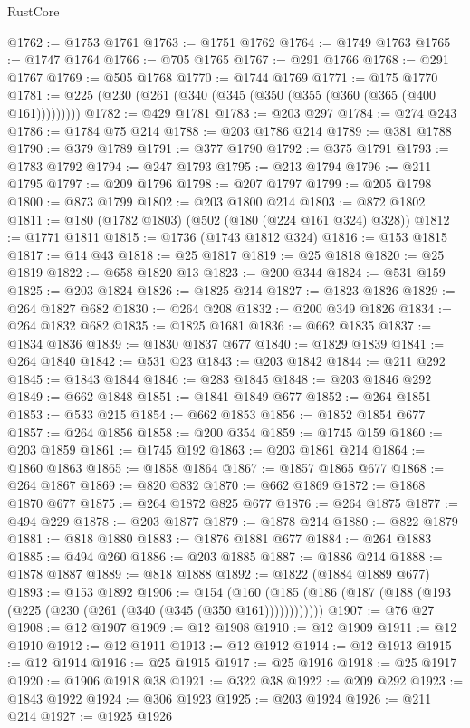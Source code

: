 \begin{lexlean}{RustCore}
\begin{coremodule}
@1762 := @1753 @1761
@1763 := @1751 @1762
@1764 := @1749 @1763
@1765 := @1747 @1764
@1766 := @705 @1765
@1767 := @291 @1766
@1768 := @291 @1767
@1769 := @505 @1768
@1770 := @1744 @1769
@1771 := @175 @1770
@1781 := @225 (@230 (@261 (@340 (@345 (@350 (@355 (@360 (@365 (@400 @161)))))))))
@1782 := @429 @1781
@1783 := @203 @297
@1784 := @274 @243
@1786 := @1784 @75 @214
@1788 := @203 @1786 @214
@1789 := @381 @1788
@1790 := @379 @1789
@1791 := @377 @1790
@1792 := @375 @1791
@1793 := @1783 @1792
@1794 := @247 @1793
@1795 := @213 @1794
@1796 := @211 @1795
@1797 := @209 @1796
@1798 := @207 @1797
@1799 := @205 @1798
@1800 := @873 @1799
@1802 := @203 @1800 @214
@1803 := @872 @1802
@1811 := @180 (@1782 @1803) (@502 (@180 (@224 @161 @324) @328))
@1812 := @1771 @1811
@1815 := @1736 (@1743 @1812 @324)
@1816 := @153 @1815
@1817 := @14 @43
@1818 := @25 @1817
@1819 := @25 @1818
@1820 := @25 @1819
@1822 := @658 @1820 @13
@1823 := @200 @344
@1824 := @531 @159
@1825 := @203 @1824
@1826 := @1825 @214
@1827 := @1823 @1826
@1829 := @264 @1827 @682
@1830 := @264 @208
@1832 := @200 @349 @1826
@1834 := @264 @1832 @682
@1835 := @1825 @1681
@1836 := @662 @1835
@1837 := @1834 @1836
@1839 := @1830 @1837 @677
@1840 := @1829 @1839
@1841 := @264 @1840
@1842 := @531 @23
@1843 := @203 @1842
@1844 := @211 @292
@1845 := @1843 @1844
@1846 := @283 @1845
@1848 := @203 @1846 @292
@1849 := @662 @1848
@1851 := @1841 @1849 @677
@1852 := @264 @1851
@1853 := @533 @215
@1854 := @662 @1853
@1856 := @1852 @1854 @677
@1857 := @264 @1856
@1858 := @200 @354
@1859 := @1745 @159
@1860 := @203 @1859
@1861 := @1745 @192
@1863 := @203 @1861 @214
@1864 := @1860 @1863
@1865 := @1858 @1864
@1867 := @1857 @1865 @677
@1868 := @264 @1867
@1869 := @820 @832
@1870 := @662 @1869
@1872 := @1868 @1870 @677
@1875 := @264 @1872 @825 @677
@1876 := @264 @1875
@1877 := @494 @229
@1878 := @203 @1877
@1879 := @1878 @214
@1880 := @822 @1879
@1881 := @818 @1880
@1883 := @1876 @1881 @677
@1884 := @264 @1883
@1885 := @494 @260
@1886 := @203 @1885
@1887 := @1886 @214
@1888 := @1878 @1887
@1889 := @818 @1888
@1892 := @1822 (@1884 @1889 @677)
@1893 := @153 @1892
@1906 := @154
    (@160 (@185 (@186 (@187 (@188 (@193 (@225 (@230 (@261 (@340 (@345 (@350 @161))))))))))))
@1907 := @76 @27
@1908 := @12 @1907
@1909 := @12 @1908
@1910 := @12 @1909
@1911 := @12 @1910
@1912 := @12 @1911
@1913 := @12 @1912
@1914 := @12 @1913
@1915 := @12 @1914
@1916 := @25 @1915
@1917 := @25 @1916
@1918 := @25 @1917
@1920 := @1906 @1918 @38
@1921 := @322 @38
@1922 := @209 @292
@1923 := @1843 @1922
@1924 := @306 @1923
@1925 := @203 @1924
@1926 := @211 @214
@1927 := @1925 @1926

\end{coremodule}
\end{lexlean}
